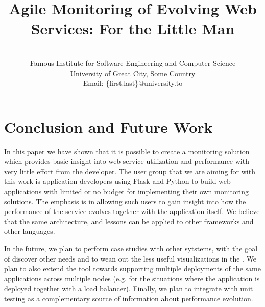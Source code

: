 \documentclass[conference]{IEEEtran}
\begin{document}
	

%
\title{Agile Monitoring of Evolving Web Services: For the Little Man}

\author{
\\
Famous Institute for Software Engineering and Computer Science\\
University of Great City, Some Country\\
Email: \{first.last\}@university.to 
}


\maketitle

















% 






\section{Conclusion and Future Work}
\label{sec:conclusions}


In this paper we have shown that it is possible to create a monitoring solution which provides basic insight into web service utilization and performance  with very little effort from the developer. The user group that we are aiming for with this work is application developers using Flask and Python to build web applications with limited or no budget for implementing their own monitoring solutions. The emphasis is in allowing such users to gain insight into how the performance of the service evolves together with the application itself. We believe that the same architecture, and lessons can be applied to other frameworks and other languages.

In the future, we plan to perform case studies with other sytstems, with the goal of discover other needs and to wean out the less useful visualizations in the \tool. We plan to also extend the tool towards supporting multiple deployments of the same applications across multiple nodes (e.g. for the situations where the application is deployed together with a load balancer). Finally, we plan to integrate \tool with unit testing as a complementary source of information about performance evolution.



% 







\end{document}
